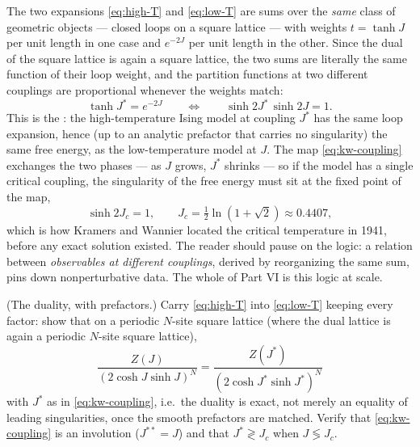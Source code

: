 The two expansions \eqref{eq:high-T} and \eqref{eq:low-T} are sums over
the \emph{same} class of geometric objects --- closed loops on a square
lattice --- with weights $t = \tanh J$ per unit length in one case and
$e^{-2J}$ per unit length in the other. Since the dual of the square
lattice is again a square lattice, the two sums are literally the same
function of their loop weight, and the partition functions at two
different couplings are proportional whenever the weights match:
\begin{equation}
\tanh J^{*} = e^{-2J}
\qquad\Longleftrightarrow\qquad
\sinh 2J^{*} \, \sinh 2J = 1 .
\label{eq:kw-coupling}
\end{equation}
This is the : the high-temperature Ising
model at coupling $J^*$ has the same loop expansion, hence (up to an
analytic prefactor that carries no singularity) the same free energy, as
the low-temperature model at $J$. The map \eqref{eq:kw-coupling}
exchanges the two phases --- as $J$ grows, $J^*$ shrinks --- so if the
model has a single critical coupling, the singularity of the free energy
must sit at the fixed point of the map,
\begin{equation}
\sinh 2J_c = 1, \qquad J_c = \tfrac12 \ln\left(1 + \sqrt2\right)
\approx 0.4407,
\label{eq:kw-critical}
\end{equation}
which is how Kramers and Wannier located the critical temperature in
1941, before any exact solution existed. The reader should pause on the
logic: a relation between \emph{observables at different couplings},
derived by reorganizing the same sum, pins down nonperturbative data. The
whole of Part VI is this logic at scale.

\begin{exercise}[classic]
\label{exr:kw-derivation}
(The duality, with prefactors.) Carry \eqref{eq:high-T} into
\eqref{eq:low-T} keeping every factor: show that on a periodic $N$-site square
lattice (where the dual lattice is again a periodic $N$-site square
lattice),
\begin{equation*}
\frac{Z(J)}{\left(2\cosh J \sinh J\right)^{N}}
= \frac{Z(J^*)}{\left(2\cosh J^* \sinh J^*\right)^{N}}
\end{equation*}
with $J^*$ as in \eqref{eq:kw-coupling}, i.e.\ the duality is exact, not
merely an equality of leading singularities, once the smooth prefactors
are matched. Verify that \eqref{eq:kw-coupling} is an involution
($J^{**} = J$) and that $J^* \gtrless J_c$ when $J \lessgtr J_c$.
\end{exercise}

